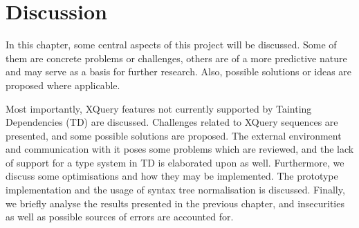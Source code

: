 \chapter{Discussion}
\label{chapter:discussion}
In this chapter, some central aspects of this project will be discussed. Some
of them are concrete problems or challenges, others are of a more predictive
nature and may serve as a basis for further research. Also, possible
solutions or ideas are proposed where applicable. 

Most importantly, XQuery features not currently supported by Tainting
Dependencies (TD) are discussed. Challenges related to XQuery sequences are
presented, and some possible solutions are proposed. The external environment
and communication with it poses some problems which are reviewed, and the
lack of support for a type system in TD is elaborated upon as well.
Furthermore, we discuss some optimisations and how they may be implemented.
The prototype implementation and the usage of syntax tree normalisation is
discussed. Finally, we briefly analyse the results presented in the previous
chapter, and insecurities as well as possible sources of errors are accounted
for.








